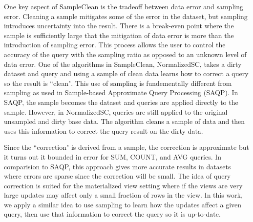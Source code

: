One key aspect of SampleClean is the tradeoff between data error and sampling error.
Cleaning a sample mitigates some of the error in the dataset, but sampling introduces uncertainty into the result.
There is a break-even point where the sample is sufficiently large that the mitigation of data error is more than the introduction
of sampling error.
This process allows the user to control the accuracy of the query with the sampling ratio as opposed to an unknown level of data error.
One of the algorithms in SampleClean, NormalizedSC, takes a dirty dataset and query and using a sample of clean data learns how
to correct a query so the result is ``clean".
This use of sampling is fundementally different from sampling as used in Sample-based Approximate Query Processing (SAQP).
In SAQP, the sample becomes the dataset and queries are applied directly to the sample.
However, in NormalizedSC, queries are still applied to the original unsampled and dirty base data.
The algorithm cleans a sample of data and then uses this information to correct the query result on the dirty data.

Since the ``correction" is derived from a sample, the correction is approximate but it turns out it bounded in error for SUM, COUNT, and AVG queries.
In comparision to SAQP, this approach gives more accurate results in datasets where errors are sparse since the correction will be small.
The idea of query correction is suited for the materialized view setting where if the views are very large updates may affect only a small fraction of rows in the view.
In this work, we apply a similar idea to use sampling to learn how the updates affect a given query, then use that information to correct the query so it is up-to-date.


